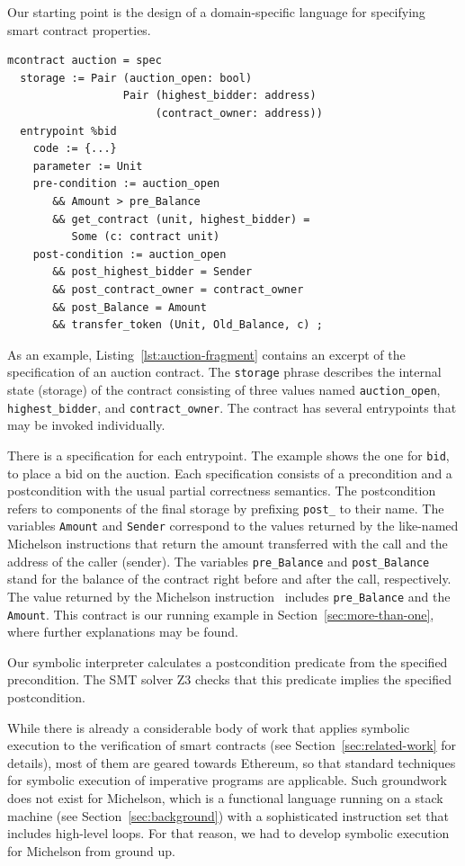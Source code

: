 \documentclass[a4paper,USenglish,cleveref, autoref,anonymous]{lipics-v2021}
\begin{document}
Our starting point is the design of a domain-specific language for
specifying smart contract properties.
\begin{lstlisting}[float=tp,captionpos=b,caption={Auction contract specification (excerpt)},label={lst:auction-fragment}]
mcontract auction = spec 
  storage := Pair (auction_open: bool) 
                  Pair (highest_bidder: address)
                       (contract_owner: address))
  entrypoint %bid
    code := {...}
    parameter := Unit 
    pre-condition := auction_open 
       && Amount > pre_Balance 
       && get_contract (unit, highest_bidder) = 
          Some (c: contract unit)
    post-condition := auction_open
       && post_highest_bidder = Sender 
       && post_contract_owner = contract_owner 
       && post_Balance = Amount 
       && transfer_token (Unit, Old_Balance, c) ;
\end{lstlisting}
As an example, Listing~\ref{lst:auction-fragment} contains an excerpt
of the specification of an auction contract. The \texttt{storage}
phrase describes the internal state (storage) of the contract
consisting of three values named \lstinline|auction_open|,
\lstinline|highest_bidder|, and \lstinline|contract_owner|.
The contract has several entrypoints that may be invoked individually.

There is a specification for each entrypoint. The example shows the
one for  \lstinline|bid|, to place a bid on the auction. Each
specification consists of a precondition and a 
postcondition with the usual partial correctness semantics. The
postcondition refers to components of the final storage by prefixing
\lstinline|post_| to their name. The variables
\lstinline|Amount| and \lstinline|Sender| correspond to the values
returned by the like-named Michelson instructions that return the
amount transferred with the call and the address of the caller
(sender).  The variables \lstinline|pre_Balance| and
\lstinline|post_Balance| stand for the balance of the contract right
before and after the call, respectively. The value returned by the
Michelson instruction \BALANCE\ includes 
\lstinline|pre_Balance| and the \lstinline|Amount|.
This contract is our running example in
Section~\ref{sec:more-than-one}, where further explanations may be found.

Our symbolic interpreter calculates a postcondition predicate from the specified
precondition. The SMT solver Z3 \cite{z3} checks that this predicate
implies the specified postcondition.

While there is already a considerable body of work that applies
symbolic execution to the verification of smart contracts
\cite{securify, manticore,kevm,park} (see
Section~\ref{sec:related-work} for details), most of them are geared
towards Ethereum, so that standard techniques for symbolic execution
of imperative programs are applicable. Such groundwork does not exist
for Michelson, which is a functional language running on a stack
machine (see Section~\ref{sec:background}) with a sophisticated
instruction set that includes high-level loops. For that reason, we had to
develop symbolic execution for Michelson from ground up.
\end{document}
